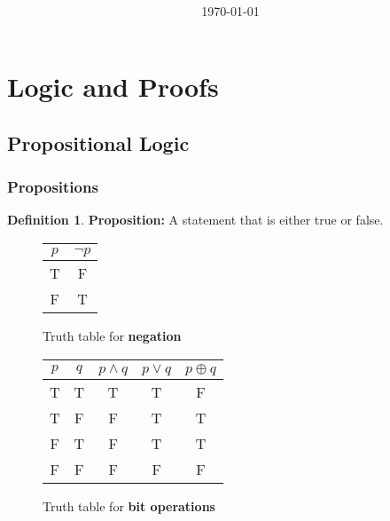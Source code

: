 \documentclass[article, 11pt]{article}
\title{
    \vspace{2in}
    \textmd{\textbf{\studyTitle}}
    \normalsize\vspace{0.1in}\\
    \vspace{0.1in}\large{\text{\class}} \\
    \vspace{0.1in}\text{\professor}\\
    \vspace{0.1in}\large\text{Final: \text{\final}}\\
    \vspace{3in}
}
\author{\name}
\date{\today}
\theoremstyle{definition}
\newtheorem{definition}{Definition}[section]
\newcommand{\xor}{\oplus} %
\begin{document}
    \maketitle
    \thispagestyle{empty}
    \pagebreak
    \tableofcontents
    \pagebreak
    
    \section{Logic and Proofs}  
    \subsection{Propositional Logic}
    \subsubsection{Propositions}
    \begin{definition}
        \textbf{Proposition:} A statement that is either true or false.
    \end{definition}    
    \begin{figure}[H]
        \centering
            \begin{tabular}{c|c}
                $p$ & $\neg p$ \\
                \hline
                T & F \\
                F & T
            \end{tabular}
        \caption{Truth table for \textbf{negation}}
    \end{figure}
    \begin{figure}[H]
        \centering
            \begin{tabular}{c|c|c|c|c}
                $p$ & $q$ & $p \land q$ & $p \lor q$ & $p \xor q$ \\
                \hline
                T & T & T & T & F \\
                T & F & F & T & T \\
                F & T & F & T & T \\
                F & F & F & F & F
            \end{tabular}
        \caption{Truth table for \textbf{bit operations}}
    \end{figure}
\end{document}
